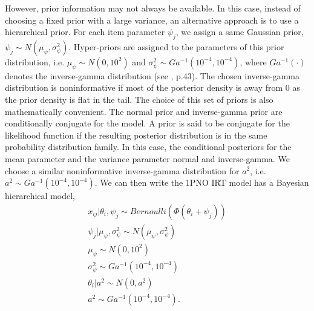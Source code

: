 \documentclass[floatsintext, man]{apa7}
\begin{document}
However, prior information may not always be available. In this case, instead of
choosing a fixed prior with a large variance, an alternative approach is to use
a hierarchical prior. For each item parameter $\psi_j$, we assign a same
Gaussian prior, $\psi_j \sim N(\mu_\psi, \sigma_\psi^2)$. Hyper-priors are
assigned to the parameters of this prior distribution, i.e. $\mu_\psi \sim N(0,
10^2)$ and $\sigma_\psi^2 \sim Ga^{-1}(10^{-4}, 10^{-4})$, where $Ga^{-1}
(\cdot)$ denotes the inverse-gamma distribution (see 
\cite{gelman_bayesian_2013}, p.43). The chosen inverse-gamma distribution is
noninformative if most of the posterior density is away from $0$
as the prior density is flat in the tail. The choice of this set of priors is
also mathematically convenient. The normal prior and inverse-gamma prior are
conditionally conjugate for the model. A prior is said to be conjugate for the
likelihood function if the resulting posterior distribution is in the same
probability distribution family. In this case, the conditional posteriors for
the mean parameter and the variance parameter normal and inverse-gamma. We
choose a similar noninformative inverse-gamma distribution for
$a^2$, i.e. $a^2 \sim Ga^{-1} (10^{-4}, 10^{-4})$. We can then write the 1PNO
IRT model has a Bayesian hierarchical model,
\begin{equation}
\label{eq:1pno_original}
\begin{gathered}
  x_{ij} | \theta_i, \psi_j \sim Bernoulli(\Phi(\theta_i + \psi_j))\\
  \psi_j | \mu_\psi, \sigma_\psi^2 \sim N(\mu_\psi, \sigma_\psi^2)\\
  \mu_\psi \sim N(0, 10^2)\\
  \sigma_\psi^2 \sim Ga^{-1}(10^{-4}, 10^{-4})\\
  \theta_i | a^2 \sim N(0, a^2)\\
  a^2 \sim Ga^{-1}(10^{-4}, 10^{-4}).
\end{gathered}
\end{equation}
\end{document}
